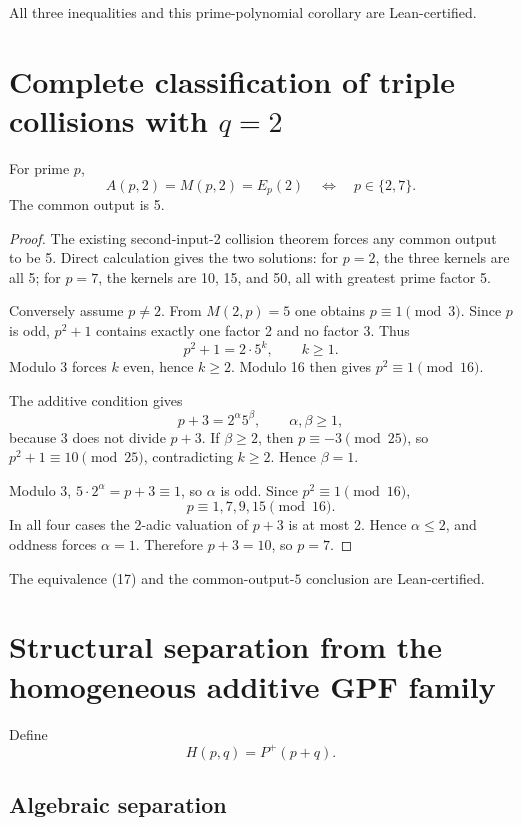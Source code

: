 \documentclass[10pt,a4paper]{scrartcl}
\begin{document}
All three inequalities and this prime-polynomial corollary are Lean-certified.

\section{Complete classification of triple collisions with \texorpdfstring{$q=2$}{q=2}}

For prime $p$,
\begin{equation}
A(p,2)=M(p,2)=E_p(2)\quad\Longleftrightarrow\quad p\in\{2,7\}. \tag{17}
\end{equation}
The common output is 5.

\begin{proof}
The existing second-input-2 collision theorem forces any common output to be 5. Direct calculation gives the two solutions: for $p=2$, the three kernels are all 5; for $p=7$, the kernels are 10, 15, and 50, all with greatest prime factor 5.

Conversely assume $p\ne2$. From $M(2,p)=5$ one obtains $p\equiv1\pmod3$. Since $p$ is odd, $p^2+1$ contains exactly one factor 2 and no factor 3. Thus
\[
p^2+1=2\cdot5^k,\qquad k\ge1.
\]
Modulo 3 forces $k$ even, hence $k\ge2$. Modulo 16 then gives $p^2\equiv1\pmod{16}$.

The additive condition gives
\[
p+3=2^\alpha5^\beta,\qquad \alpha,\beta\ge1,
\]
because 3 does not divide $p+3$. If $\beta\ge2$, then $p\equiv-3\pmod{25}$, so $p^2+1\equiv10\pmod{25}$, contradicting $k\ge2$. Hence $\beta=1$.

Modulo 3, $5\cdot2^\alpha=p+3\equiv1$, so $\alpha$ is odd. Since $p^2\equiv1\pmod{16}$,
\[
p\equiv1,7,9,15\pmod{16}.
\]
In all four cases the 2-adic valuation of $p+3$ is at most 2. Hence $\alpha\le2$, and oddness forces $\alpha=1$. Therefore $p+3=10$, so $p=7$.
\end{proof}

The equivalence (17) and the common-output-$5$ conclusion are Lean-certified.

\section{Structural separation from the homogeneous additive GPF family}

Define
\[
H(p,q)=P^+(p+q).
\]

\subsection{Algebraic separation}
\end{document}
